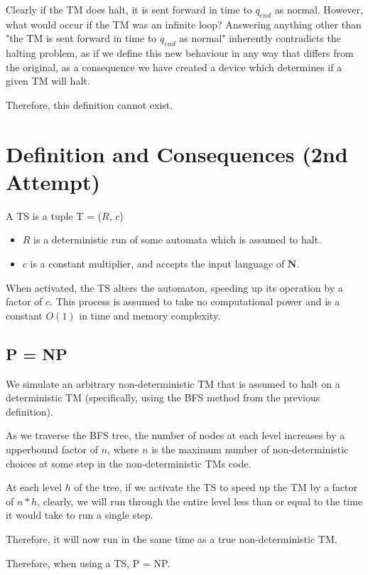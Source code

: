 \documentclass{report}
\begin{document}
Clearly if the TM does halt, it is sent forward in time to $q_{end}$ as normal. However, what would occur if the TM was an infinite loop? Answering anything other than "the TM is sent forward in time to $q_{end}$ as normal" inherently contradicts the halting problem, as if we define this new behaviour in any way that differs from the original, as a consequence we have created a device which determines if a given TM will halt.

Therefore, this definition cannot exist.

\newpage
\section {Definition and Consequences (2nd Attempt)}

A TS is a tuple T = ($R$, $c$)

\begin{itemize}
  \item $R$ is a deterministic run of some automata which is assumed to halt.
  \item $c$ is a constant multiplier, and accepts the input language of $\mathbf{N}$.
\end{itemize}

When activated, the TS alters the automaton, speeding up its operation by a factor of $c$. This process is assumed to take no computational power and is a constant $O(1)$ in time and memory complexity.

\subsection{P = NP}

We simulate an arbitrary non-deterministic TM that is assumed to halt on a deterministic TM (specifically, using the BFS method from the previous definition).

As we traverse the BFS tree, the number of nodes at each level  increases by a upperbound factor of $n$, where $n$ is the maximum number of non-deterministic choices at some step in the non-deterministic TMs code.

At each level $h$ of the tree, if we activate the TS to speed up the TM by a factor of $n*h$, clearly, we will run through the entire level less than or equal to the time it would take to run a single step.

Therefore, it will now run in the same time as a true non-deterministic TM.

Therefore, when using a TS, P = NP.
\end{document}
